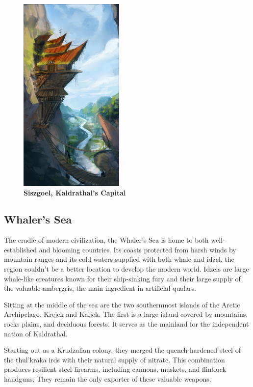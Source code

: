 \begin{figure}[t]
    \centering
    \includegraphics[width=0.46\textwidth]{01intro/img/13siszgoel.png}
    \caption*{\centering \large{\textbf{Siszgoel, Kaldrathal's Capital}}} %
\end{figure}

\subsection*{Whaler's Sea}
The cradle of modern civilization, the Whaler's Sea is home to both well-established and blooming countries.
Its coasts protected from harsh winds by mountain ranges and its cold waters supplied with both whale and idzel, the region couldn't be a better location to develop the modern world.
Idzels are large whale-like creatures known for their ship-sinking fury and their large supply of the valuable ambergris, the main ingredient in artificial qualars.

Sitting at the middle of the sea are the two southernmost islands of the Arctic Archipelago, Krejek and Kaljek.
The first is a large island covered by mountains, rocks plains, and deciduous forests.
It serves as the mainland for the independent nation of Kaldrathal.

Starting out as a Krudzalian colony, they merged the quench-hardened steel of the thul'kraka irds with their natural supply of nitrate.
This combination produces resilient steel firearms, including cannons, muskets, and flintlock handguns.
They remain the only exporter of these valuable weapons.

